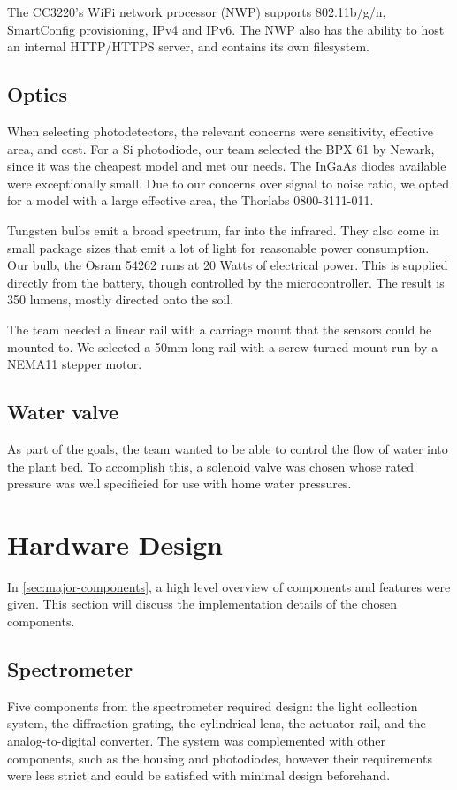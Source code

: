 \documentclass[journal]{IEEEtran}
\begin{document}
The CC3220's WiFi network processor (NWP) supports 802.11b/g/n, SmartConfig provisioning, IPv4 and IPv6. The NWP also has the ability to host an internal HTTP/HTTPS server, and contains its own filesystem.
\subsection{Optics}
When selecting photodetectors, the relevant concerns were sensitivity, effective area, and cost. For a Si photodiode, our team selected the BPX 61 by Newark, since it was the cheapest model and met our needs. The InGaAs diodes available were exceptionally small. Due to our concerns over signal to noise ratio, we opted for a model with a large effective area, the Thorlabs 0800-3111-011.

Tungsten bulbs emit a broad spectrum, far into the infrared. They also come in small package sizes that emit a lot of light for reasonable power consumption. Our bulb, the Osram 54262 runs at 20 Watts of electrical power. This is supplied directly from the battery, though controlled by the microcontroller. The result is 350 lumens, mostly directed onto the soil.

The team needed a linear rail with a carriage mount that the sensors could be mounted to. We selected a 50mm long rail with a screw-turned mount run by a NEMA11 stepper motor.
\subsection{Water valve}
As part of the goals, the team wanted to be able to control the flow of water into the plant bed. To accomplish this, a solenoid valve was chosen whose rated pressure was well specificied for use with home water pressures.
\section{Hardware Design}
In \autoref{sec:major-components}, a high level overview of components and features were given. This section will discuss the implementation details of the chosen components.
\subsection{Spectrometer}
Five components from the spectrometer required design: the light collection system, the diffraction grating, the cylindrical lens, the actuator rail, and the analog-to-digital converter. The system was complemented with other components, such as the housing and photodiodes, however their requirements were less strict and could be satisfied with minimal design beforehand. 
\end{document}
